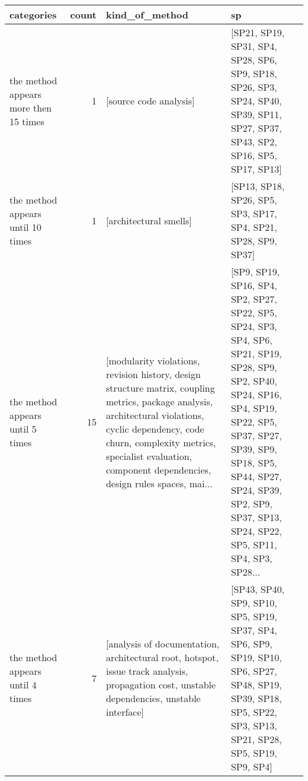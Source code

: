 \begin{tabular}{lrll}
\toprule
                            categories &  count &                                                                                                                                                                                                                                                  kind\_of\_method &                                                                                                                                                                                                                                                              sp \\
\midrule
 the method appears more then 15 times &      1 &                                                                                                                                                                                                                                          [source code analysis] &                                                                                                                                  [SP21, SP19, SP31, SP4, SP28, SP6, SP9, SP18, SP26, SP3, SP24, SP40, SP39, SP11, SP27, SP37, SP43, SP2, SP16, SP5, SP17, SP13] \\
     the method appears until 10 times &      1 &                                                                                                                                                                                                                                          [architectural smells] &                                                                                                                                                                                                  [SP13, SP18, SP26, SP5, SP3, SP17, SP4, SP21, SP28, SP9, SP37] \\
      the method appears until 5 times &     15 &  [modularity violations, revision history, design structure matrix, coupling metrics, package analysis, architectural violations, cyclic dependency, code churn, complexity metrics, specialist evaluation, component dependencies, design rules spaces, mai... &  [SP9, SP19, SP16, SP4, SP2, SP27, SP22, SP5, SP24, SP3, SP4, SP6, SP21, SP19, SP28, SP9, SP2, SP40, SP24, SP16, SP4, SP19, SP22, SP5, SP37, SP27, SP39, SP9, SP18, SP5, SP44, SP27, SP24, SP39, SP2, SP9, SP37, SP13, SP24, SP22, SP5, SP11, SP4, SP3, SP28... \\
      the method appears until 4 times &      7 &                                                                                                                     [analysis of documentation, architectural root, hotspot, issue track analysis, propagation cost, unstable dependencies, unstable interface] &                                                                                                   [SP43, SP40, SP9, SP10, SP5, SP19, SP37, SP4, SP6, SP9, SP19, SP10, SP6, SP27, SP48, SP19, SP39, SP18, SP5, SP22, SP3, SP13, SP21, SP28, SP5, SP19, SP9, SP4] \\

\end{tabular}
